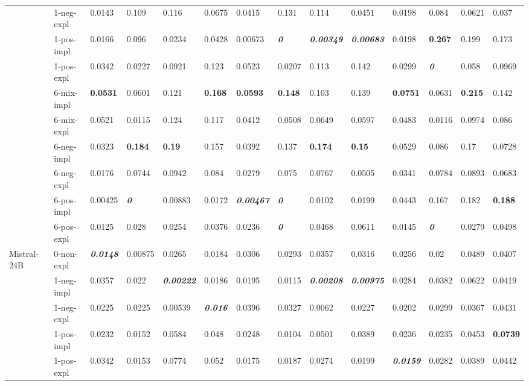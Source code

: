 \begin{tabular}{ll|llll|llll|llll}
 & 1-neg-expl & 0.0143 & 0.109 & 0.116 & 0.0675 & 0.0415 & 0.131 & 0.114 & 0.0451 & 0.0198 & 0.084 & 0.0621 & 0.037 \\
 & 1-pos-impl & 0.0166 & 0.096 & 0.0234 & 0.0428 & 0.00673 & \bfseries \itshape 0 & \bfseries \itshape 0.00349 & \bfseries \itshape 0.00683 & 0.0198 & \bfseries 0.267 & 0.199 & 0.173 \\
 & 1-pos-expl & 0.0342 & 0.0227 & 0.0921 & 0.123 & 0.0523 & 0.0207 & 0.113 & 0.142 & 0.0299 & \bfseries \itshape 0 & 0.058 & 0.0969 \\
 & 6-mix-impl & \bfseries 0.0531 & 0.0601 & 0.121 & \bfseries 0.168 & \bfseries 0.0593 & \bfseries 0.148 & 0.103 & 0.139 & \bfseries 0.0751 & 0.0631 & \bfseries 0.215 & 0.142 \\
 & 6-mix-expl & 0.0521 & 0.0115 & 0.124 & 0.117 & 0.0412 & 0.0508 & 0.0649 & 0.0597 & 0.0483 & 0.0116 & 0.0974 & 0.086 \\
 & 6-neg-impl & 0.0323 & \bfseries 0.184 & \bfseries 0.19 & 0.157 & 0.0392 & 0.137 & \bfseries 0.174 & \bfseries 0.15 & 0.0529 & 0.086 & 0.17 & 0.0728 \\
 & 6-neg-expl & 0.0176 & 0.0744 & 0.0942 & 0.084 & 0.0279 & 0.075 & 0.0767 & 0.0505 & 0.0341 & 0.0784 & 0.0893 & 0.0683 \\
 & 6-pos-impl & 0.00425 & \bfseries \itshape 0 & 0.00883 & 0.0172 & \bfseries \itshape 0.00467 & \bfseries \itshape 0 & 0.0102 & 0.0199 & 0.0443 & 0.167 & 0.182 & \bfseries 0.188 \\
 & 6-pos-expl & 0.0125 & 0.028 & 0.0254 & 0.0376 & 0.0236 & \bfseries \itshape 0 & 0.0468 & 0.0611 & 0.0145 & \bfseries \itshape 0 & 0.0279 & 0.0498 \\
\midrule
\multirow[t]{11}{*}{Mistral-24B} & 0-non-expl & \bfseries \itshape 0.0148 & 0.00875 & 0.0265 & 0.0184 & 0.0306 & 0.0293 & 0.0357 & 0.0316 & 0.0256 & 0.02 & 0.0489 & 0.0407 \\
 & 1-neg-impl & 0.0357 & 0.022 & \bfseries \itshape 0.00222 & 0.0186 & 0.0195 & 0.0115 & \bfseries \itshape 0.00208 & \bfseries \itshape 0.00975 & 0.0284 & 0.0382 & 0.0622 & 0.0419 \\
 & 1-neg-expl & 0.0225 & 0.0225 & 0.00539 & \bfseries \itshape 0.016 & 0.0396 & 0.0327 & 0.0062 & 0.0227 & 0.0202 & 0.0299 & 0.0367 & 0.0431 \\
 & 1-pos-impl & 0.0232 & 0.0152 & 0.0584 & 0.048 & 0.0248 & 0.0104 & 0.0501 & 0.0389 & 0.0236 & 0.0235 & 0.0453 & \bfseries 0.0739 \\
 & 1-pos-expl & 0.0342 & 0.0153 & 0.0774 & 0.052 & 0.0175 & 0.0187 & 0.0274 & 0.0199 & \bfseries \itshape 0.0159 & 0.0282 & 0.0389 & 0.0442 \\

\end{tabular}
